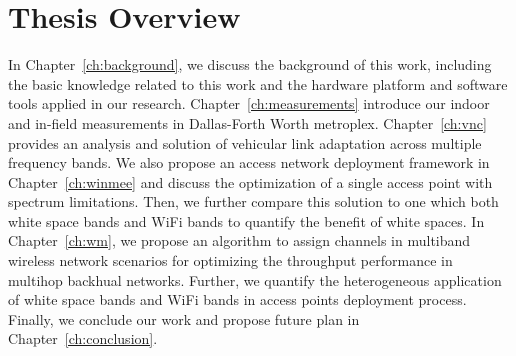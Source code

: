 \section{Thesis Overview}

In Chapter~\ref{ch:background}, we discuss the background of this work, 
including the basic knowledge related to this work and the hardware 
platform and software tools applied in our research. 
Chapter~\ref{ch:measurements} introduce our indoor and in-field measurements in 
Dallas-Forth Worth metroplex.
Chapter~\ref{ch:vnc} 
provides an analysis and solution of vehicular link adaptation across multiple frequency bands. 
We also propose an access network deployment 
framework in Chapter~\ref{ch:winmee} and discuss the optimization of a 
single access point with spectrum limitations. Then, we further
compare this solution to one which both white space bands and WiFi 
bands to quantify the benefit of white spaces. In Chapter~\ref{ch:wm}, we propose an 
algorithm to assign channels in multiband wireless network scenarios for 
optimizing the throughput performance in multihop backhual networks. Further, we 
quantify the heterogeneous application of white space bands and WiFi bands 
in access points deployment process. 
Finally, we conclude our work and propose future plan in Chapter~\ref{ch:conclusion}.

